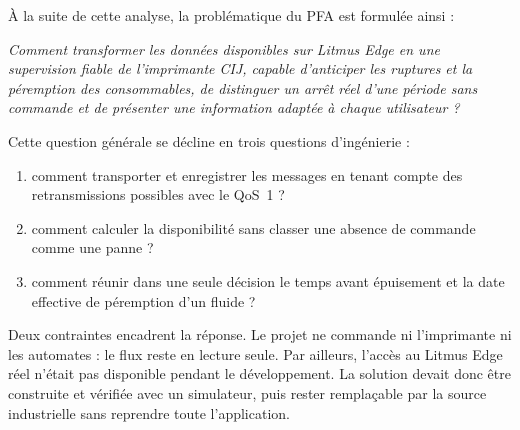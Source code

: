 À la suite de cette analyse, la problématique du PFA est formulée ainsi :

\begin{projectbox}
\centering
\emph{Comment transformer les données disponibles sur Litmus Edge en une
supervision fiable de l'imprimante CIJ, capable d'anticiper les ruptures et la
péremption des consommables, de distinguer un arrêt réel d'une période sans
commande et de présenter une information adaptée à chaque utilisateur ?}
\end{projectbox}

Cette question générale se décline en trois questions d'ingénierie :

\begin{enumerate}
  \item comment transporter et enregistrer les messages en tenant compte des
        retransmissions possibles avec le QoS~1 ?
  \item comment calculer la disponibilité sans classer une absence de commande
        comme une panne ?
  \item comment réunir dans une seule décision le temps avant épuisement et la
        date effective de péremption d'un fluide ?
\end{enumerate}

Deux contraintes encadrent la réponse. Le projet ne commande ni l'imprimante
ni les automates : le flux reste en lecture seule. Par ailleurs, l'accès au
Litmus Edge réel n'était pas disponible pendant le développement. La solution
devait donc être construite et vérifiée avec un simulateur, puis rester
remplaçable par la source industrielle sans reprendre toute l'application.
